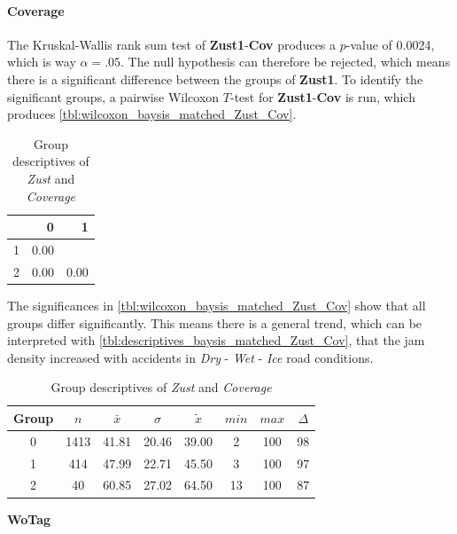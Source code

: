 \paragraph{Coverage}
The Kruskal-Wallis rank sum test of \textbf{Zust1}-\textbf{Cov} produces a $p$-value of 0.0024, which is way $\alpha=.05$. The null hypothesis can therefore be rejected, which means there is a significant difference between the groups of \textbf{Zust1}. To identify the significant groups, a pairwise Wilcoxon $T$-test for \textbf{Zust1}-\textbf{Cov} is run, which produces \autoref{tbl:wilcoxon_baysis_matched_Zust_Cov}. 
\begin{table}[ht]
	\small
	\centering
    \begin{tabular}{rrr}
        \toprule
        & 0 & 1 \\ 
        \midrule
        1 & 0.00 &  \\ 
        2 & 0.00 & 0.00 \\ 
        \bottomrule
      \end{tabular}
	\caption{Group descriptives of \textit{Zust} and \textit{Coverage}}
	\label{tbl:wilcoxon_baysis_matched_Zust_Cov}
\end{table}
The significances in \autoref{tbl:wilcoxon_baysis_matched_Zust_Cov} show that all groups differ significantly. This means there is a general trend, which can be interpreted with \autoref{tbl:descriptives_baysis_matched_Zust_Cov}, that the jam density increased with accidents in \textit{Dry} - \textit{Wet} - \textit{Ice} road conditions.
\begin{table}[ht]
	\small
	\centering
    \begin{tabular}{c|c|c|c|c|c|c|c}
        \toprule
        Group & $n$ & $\bar{x}$ & $\sigma$ & $\tilde{x}$ & $min$ & $max$ & $\Delta$ \\ 
        \midrule
        0 & 1413 & 41.81 & 20.46 & 39.00 & 2  & 100 & 98 \\ 
        1 & 414  & 47.99 & 22.71 & 45.50 & 3  & 100 & 97 \\ 
        2 & 40   & 60.85 & 27.02 & 64.50 & 13 & 100 & 87 \\ 
        \bottomrule
      \end{tabular}
	\caption{Group descriptives of \textit{Zust} and \textit{Coverage}}
	\label{tbl:descriptives_baysis_matched_Zust_Cov}
\end{table}

\Large
\centerline{\textbf{WoTag}}
\normalsize

